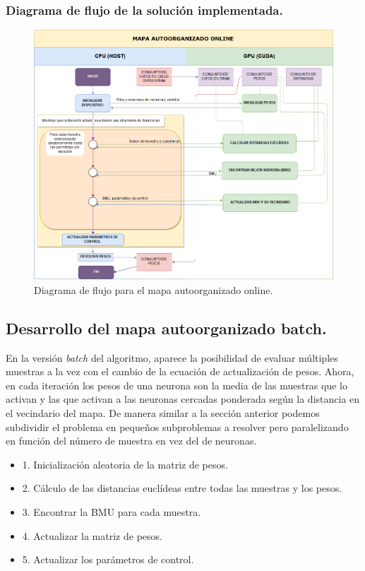 \subsubsection{Diagrama de flujo de la solución implementada.}
\begin{figure}[ht]
\centering
\includegraphics[scale=0.35]{imagenes/flujosomonline.png}
\caption{Diagrama de flujo para el mapa autoorganizado online.}
\end{figure}


\subsection{Desarrollo del mapa autoorganizado batch.}
En la versión \textit{batch} del algoritmo, aparece la posibilidad de evaluar múltiples muestras a la vez con el cambio de la ecuación de actualización de pesos. Ahora, en cada iteración los pesos de una neurona son la media de las muestras que lo activan y las que activan a las neuronas cercadas ponderada según la distancia en el vecindario del mapa. De manera similar a la sección anterior podemos subdividir el problema en pequeños subproblemas a resolver pero paralelizando en función del número de muestra en vez del de neuronas.

\begin{itemize}
  \item 1. Inicialización aleatoria de la matriz de pesos.
  \item 2. Cálculo de las distancias euclídeas entre todas las muestras y los pesos.
  \item 3. Encontrar la BMU para cada muestra.
  \item 4. Actualizar la matriz de pesos.
  \item 5. Actualizar los parámetros de control.
\end{itemize}

